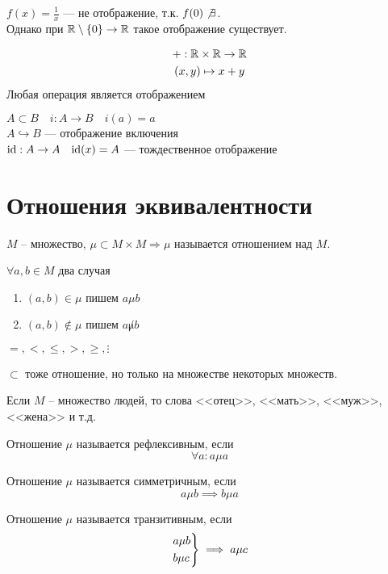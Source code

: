 \documentclass[main]{subfiles}
\begin{document}
\begin{example}
    $f(x) = \frac{1}{x}$ --- не отображение, т.к. $f(0) \not\exists$.\\
    Однако при $\mathbb{R} \setminus \{0\} \to \mathbb{R}$ такое отображение существует.
\end{example}
\begin{example}
    \begin{gather*}
        +:\mathbb{R} \times \mathbb{R}  \to \mathbb{R} \\
        (x,y)           \mapsto x+ y
    \end{gather*}
    Любая операция является отображением
\end{example}
\begin{example}
    $A \subset B \quad i:A\to B \quad i(a)=a$\\
    $ A \hookrightarrow B$ --- отображение включения\\
    $\mathrm{id}:A \to A \quad  \mathrm{id}(x)=A$ --- тождественное отображение
\end{example}


\section{Отношения эквивалентности}
\begin{definition}
    $M$ -- множество, $\mu \subset M \times M \Rightarrow \mu$ называется
    отношением над $M$.

    $\forall a,b \in M$ два случая
    \begin{enumerate}
        \item $(a,b) \in \mu$ пишем $a \mu b$
        \item $(a,b) \not\in \mu$ пишем $a \not\mu b$
    \end{enumerate}
\end{definition}
\begin{example}
    $=, <,\le , >, \ge, \vdots$

    $\subset$ тоже отношение, но только на множестве некоторых множеств.

    Если $M$ -- множество людей, то слова <<отец>>, <<мать>>, <<муж>>, <<жена>> и т.д.
\end{example}

\begin{definition}
    Отношение $\mu$ называется рефлексивным, если \[\forall a: a\mu a\]
\end{definition}
\begin{definition}
    Отношение $\mu$ называется симметричным, если \[a \mu b \implies b \mu a\]
\end{definition}
\begin{definition}
    Отношение $\mu$ называется транзитивным, если \[\begin{rcases}
            a \mu b \\
            b \mu c
        \end{rcases}\implies a\mu c\]
\end{definition}
\end{document}
